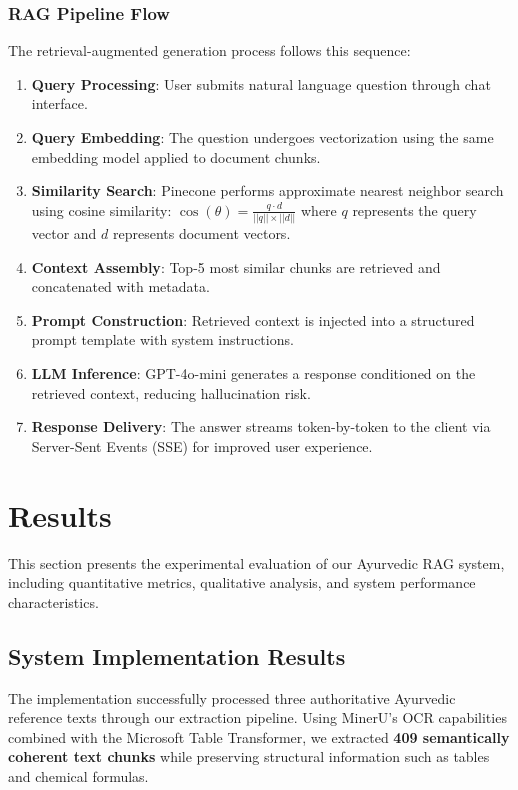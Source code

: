 \documentclass[conference]{IEEEtran}
\begin{document}
\subsubsection{RAG Pipeline Flow}
The retrieval-augmented generation process follows this sequence:

\begin{enumerate}
    \item \textbf{Query Processing}: User submits natural language question through chat interface.
    \item \textbf{Query Embedding}: The question undergoes vectorization using the same embedding model applied to document chunks.
    \item \textbf{Similarity Search}: Pinecone performs approximate nearest neighbor search using cosine similarity: $\cos(\theta) = \frac{q \cdot d}{||q|| \times ||d||}$ where $q$ represents the query vector and $d$ represents document vectors.
    \item \textbf{Context Assembly}: Top-5 most similar chunks are retrieved and concatenated with metadata.
    \item \textbf{Prompt Construction}: Retrieved context is injected into a structured prompt template with system instructions.
    \item \textbf{LLM Inference}: GPT-4o-mini generates a response conditioned on the retrieved context, reducing hallucination risk.
    \item \textbf{Response Delivery}: The answer streams token-by-token to the client via Server-Sent Events (SSE) for improved user experience.
\end{enumerate}

\section{Results}

This section presents the experimental evaluation of our Ayurvedic RAG system, including quantitative metrics, qualitative analysis, and system performance characteristics.

\subsection{System Implementation Results}
The implementation successfully processed three authoritative Ayurvedic reference texts through our extraction pipeline. Using MinerU's OCR capabilities combined with the Microsoft Table Transformer, we extracted \textbf{409 semantically coherent text chunks} while preserving structural information such as tables and chemical formulas.
\end{document}
